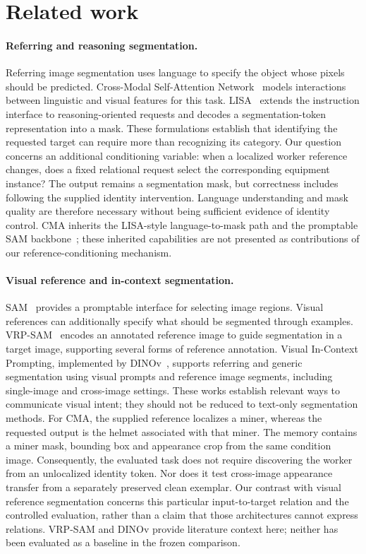 \section{Related work}
\label{sec:related}
\paragraph{Referring and reasoning segmentation.}
Referring image segmentation uses language to specify the object whose pixels
should be predicted. Cross-Modal Self-Attention Network~\cite{ye2019cross}
models interactions between linguistic and visual features for this task.
LISA~\cite{lai2024lisa} extends the instruction interface to reasoning-oriented
requests and decodes a segmentation-token representation into a mask.
These formulations establish that identifying the requested target can require
more than recognizing its category. Our question concerns an additional
conditioning variable: when a localized worker reference changes, does a
fixed relational request select the corresponding equipment instance?
The output remains a segmentation mask, but correctness includes following
the supplied identity intervention. Language understanding and mask quality
are therefore necessary without being sufficient evidence of identity control.
CMA inherits the LISA-style language-to-mask path and the promptable SAM
backbone~\cite{kirillov2023segment}; these inherited capabilities are not
presented as contributions of our reference-conditioning mechanism.

\paragraph{Visual reference and in-context segmentation.}
SAM~\cite{kirillov2023segment} provides a promptable interface for selecting
image regions. Visual references can additionally specify what should be
segmented through examples. VRP-SAM~\cite{sun2024vrp} encodes an annotated
reference image to guide segmentation in a target image, supporting several
forms of reference annotation. Visual In-Context Prompting, implemented by
DINOv~\cite{li2024visual}, supports referring and generic segmentation using
visual prompts and reference image segments, including single-image and
cross-image settings. These works establish relevant ways to communicate
visual intent; they should not be reduced to text-only segmentation methods.
For CMA, the supplied reference localizes a miner, whereas the requested
output is the helmet associated with that miner. The memory contains a miner
mask, bounding box and appearance crop from the same condition image.
Consequently, the evaluated task does not require discovering the worker
from an unlocalized identity token. Nor does it test cross-image appearance
transfer from a separately preserved clean exemplar. Our contrast with visual
reference segmentation concerns this particular input-to-target relation and
the controlled evaluation, rather than a claim that those architectures cannot
express relations. VRP-SAM and DINOv provide literature context here; neither
has been evaluated as a baseline in the frozen comparison.

